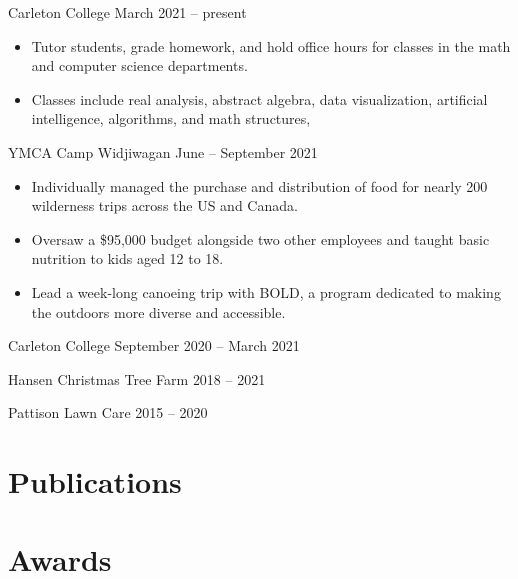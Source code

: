\documentclass{ali-resume}
\begin{document}
{Carleton College}
{March 2021 -- present}

\begin{itemize}
	\item Tutor students, grade homework, and hold office hours for classes in the math and computer science departments.
	\item Classes include
	      real analysis, %
	      abstract algebra, %
	      data visualization, %
	      artificial intelligence, %
	      algorithms, %
	      and math structures, %
\end{itemize}

{YMCA Camp Widjiwagan}
{June -- September 2021}

\begin{itemize}
	\item Individually managed the purchase and distribution of food for nearly 200 wilderness trips across the US and Canada.
	\item Oversaw a \$95,000 budget alongside two other employees and taught basic nutrition to kids aged 12 to 18.
	\item Lead a week-long canoeing trip with BOLD, a program dedicated to making the outdoors more diverse and accessible.
\end{itemize}

{Carleton College}
{September 2020 -- March 2021}

{Hansen Christmas Tree Farm}
{2018 -- 2021}

{Pattison Lawn Care}
{2015 -- 2020}

\null

\section{Publications}


\section{Awards}
\end{document}
